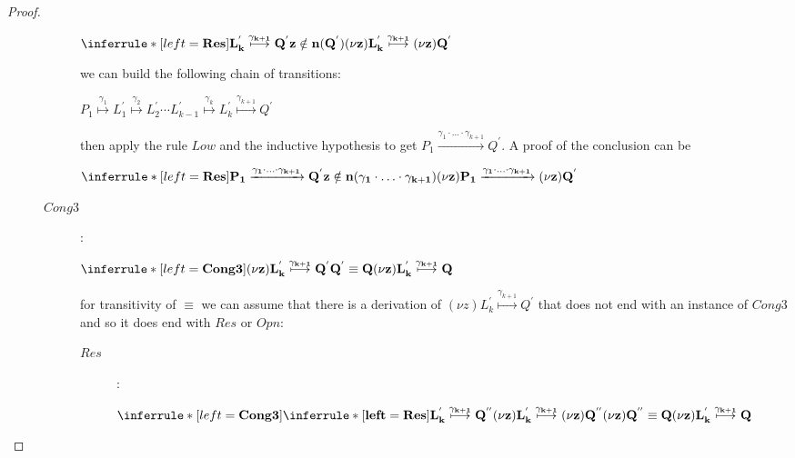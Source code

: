 \begin{proposition}
\begin{proof}
\begin{description}
\begin{description}
\begin{center}
		      $\inferrule* [left=\bf{Res}]{
			  L_{k}^{'} \stackrel{\gamma_{k+1}}{\longmapsto} Q^{'}
			\\
			  z\notin n(Q^{'})
		      }{
			(\nu z)L_{k}^{'} \stackrel{\gamma_{k+1}}{\longmapsto} (\nu z)Q^{'}
		      }$
		    \end{center}
		    we can build the following chain of transitions:
		    \begin{center}
		      $P_{1} \stackrel{\gamma_{1}}{\longmapsto} L_{1}^{'} \stackrel{\gamma_{2}}{\longmapsto} L_{2}^{'} \cdots L_{k-1}^{'} \stackrel{\gamma_{k}}{\longmapsto} L_{k}^{'}\stackrel{\gamma_{k+1}}{\longmapsto} Q^{'}$ 
		    \end{center}
		    then apply the rule $Low$ and the inductive hypothesis to get $P_{1} \xrightarrow{\gamma_{1}\cdot \ldots \cdot \gamma_{k+1}} Q^{'}$. A proof of the conclusion can be
		    \begin{center}
		      $\inferrule* [left=\bf{Res}]{
			  P_{1} \xrightarrow{\gamma_{1}\cdot \ldots \cdot \gamma_{k+1}} Q^{'}
			\\
			  z\notin n(\gamma_{1}\cdot \ldots \cdot \gamma_{k+1})
		      }{
			(\nu z)P_{1} \xrightarrow{\gamma_{1}\cdot \ldots \cdot \gamma_{k+1}} (\nu z)Q^{'}
		    }$
		    \end{center}
		  \item[$Cong3$]: 
		    \begin{center}
		      $\inferrule* [left=\bf{Cong3}]{
			  (\nu z)L_{k}^{'} \stackrel{\gamma_{k+1}}{\longmapsto} Q^{'}
			\\
			  Q^{'} \equiv Q
		      }{
			(\nu z)L_{k}^{'} \stackrel{\gamma_{k+1}}{\longmapsto} Q
		      }$
		    \end{center}
		    for transitivity of $\equiv$ we can assume that there is a derivation of $(\nu z)L_{k}^{'} \stackrel{\gamma_{k+1}}{\longmapsto} Q^{'}$ that does not end with an instance of $Cong3$ and so it does end with $Res$ or $Opn$:
		    \begin{description}
		      \item[$Res$]:
			\begin{center}
			  $\inferrule* [left=\bf{Cong3}]{
			      \inferrule* [left=\bf{Res}]{
				L_{k}^{'} \stackrel{\gamma_{k+1}}{\longmapsto} Q^{''}
			      }{
				(\nu z)L_{k}^{'} \stackrel{\gamma_{k+1}}{\longmapsto} (\nu z)Q^{''}
			      }
			    \\
			      (\nu z)Q^{''} \equiv Q
			  }{
			    (\nu z)L_{k}^{'} \stackrel{\gamma_{k+1}}{\longmapsto} Q
			  }$
			\end{center}

\end{description}
\end{description}
\end{description}
\end{proof}
\end{proposition}
